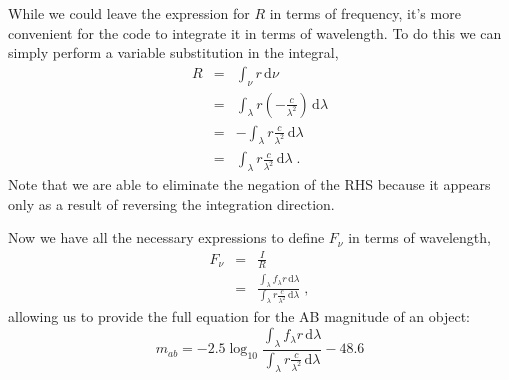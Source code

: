 \documentclass[12pt]{scrartcl}
\newcommand{\dx}[1]{\ensuremath{\,\mathrm{d}#1}}
\begin{document}
While we could leave the expression for $R$ in terms of
frequency, it's more convenient for the code to integrate it in
terms of wavelength. To do this we can simply perform a variable
substitution in the integral,
\begin{eqnarray*}
R & = & \int_\nu r \dx{\nu} \\
& = & \int_\lambda r \left(-\frac{c}{\lambda^2}\right) \dx{\lambda} \\
& = & -\int_\lambda r \frac{c}{\lambda^2} \dx{\lambda} \\
& = & \int_\lambda r \frac{c}{\lambda^2} \dx{\lambda} \; .
\end{eqnarray*}
Note that we are able to eliminate the negation of the RHS because
it appears only as a result of reversing the integration direction.

Now we have all the necessary expressions to define $F_\nu$ in terms
of wavelength,
\begin{eqnarray*}
F_\nu & = & \frac{I}{R} \\
& = & \frac{{\displaystyle \int_\lambda f_\lambda r \dx{\lambda}}}{{\displaystyle \int_\lambda r \frac{c}{\lambda^2} \dx{\lambda}}} \; ,
\end{eqnarray*}
allowing us to provide the full equation for the AB magnitude of an
object:
\[ m_{ab} = -2.5\log_{10} \frac{{\displaystyle \int_\lambda f_\lambda r \dx{\lambda}}}{{\displaystyle \int_\lambda r \frac{c}{\lambda^2} \dx{\lambda}}} - 48.6 \]
\end{document}
